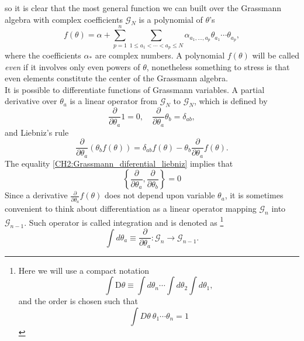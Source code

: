 so it is clear that the most general function we can built over the Grassmann algebra with complex coefficients $\mathcal{G}_{N}$ is  a polynomial of $\theta$'s
\begin{equation}
f(\theta)=\alpha+\sum_{p=1}^{n} \sum_{1 \leq a_{1}<\cdots<a_{p} \leq N} \alpha_{a_{1}, \ldots, a_{p}} \theta_{a_{1}} \cdots \theta_{a_{p}},
\label{CH2:Grassmann_function}
\end{equation}
where the coefficients $\alpha_{*}$ are complex numbers. A polynomial $f(\theta)$ will be called \textit{even} if it involves only even powers of $\theta$, nonetheless something to stress is that even elements constitute the center of the Grassmann algebra.\\
It is possible to differentiate functions of Grassmann variables. A partial derivative over $\theta_{a}$ is a linear operator from $\mathcal{G}_{N}$ to $ \mathcal{G}_{N}$, which is defined by
\begin{equation}
\frac{\partial}{\partial \theta_{a}} 1=0, \quad \frac{\partial}{\partial \theta_{a}} \theta_{b}=\delta_{a b},
\label{CH2:Grassmann_diferential}
\end{equation}
and Liebniz's rule
\begin{equation}
\frac{\partial}{\partial \theta_{a}}\left(\theta_{b} f(\theta)\right)=\delta_{a b} f(\theta)-\theta_{b} \frac{\partial}{\partial \theta_{a}} f(\theta).
\label{CH2:Grassmann_diferential_liebniz}
\end{equation}
The equality \eqref{CH2:Grassmann_diferential_liebniz} implies that 
\begin{equation}
\left\{\frac{\partial}{\partial \theta_{a}}, \frac{\partial}{\partial \theta_{b}}\right\}=0
\label{CH2:Grassmann_partial_derivative_anticommutation}
\end{equation}
Since a derivative $\frac{\partial}{\partial\theta_{a}}f(\theta)$ does not depend upon variable $\theta_{a}$, it is sometimes convenient to think about differentiation as a linear operator mapping $\mathcal{G}_{n}$ into $\mathcal{G}_{n-1}$. Such operator is called integration and is denoted as\cite{bravyi_lagrangian_2004} \footnote{Here we will use a compact notation \[\int \mathrm{D} \theta \equiv \int d \theta_{n} \cdots \int d \theta_{2} \int d \theta_{1},\] and the order is chosen such that \[\int D\theta\ \theta_1\cdots\theta_n = 1\]
}
\begin{equation}
\int d \theta_{a} \equiv \frac{\partial}{\partial \theta_{a}}: \mathcal{G}_{n} \rightarrow \mathcal{G}_{n-1}.
\label{CH2:Grassmann_Integration_relation}
\end{equation}

